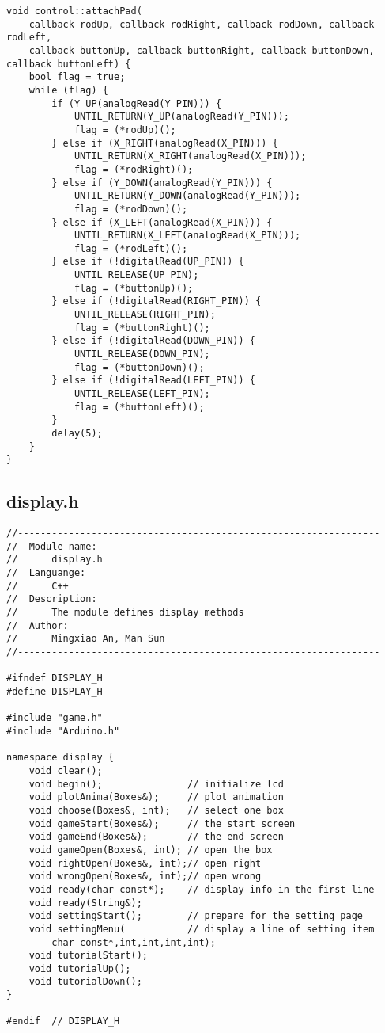 \begin{verbatim}
void control::attachPad(
    callback rodUp, callback rodRight, callback rodDown, callback rodLeft,
    callback buttonUp, callback buttonRight, callback buttonDown, callback buttonLeft) {
    bool flag = true;
    while (flag) {
        if (Y_UP(analogRead(Y_PIN))) {
            UNTIL_RETURN(Y_UP(analogRead(Y_PIN)));
            flag = (*rodUp)();
        } else if (X_RIGHT(analogRead(X_PIN))) {
            UNTIL_RETURN(X_RIGHT(analogRead(X_PIN)));
            flag = (*rodRight)();
        } else if (Y_DOWN(analogRead(Y_PIN))) {
            UNTIL_RETURN(Y_DOWN(analogRead(Y_PIN)));
            flag = (*rodDown)();
        } else if (X_LEFT(analogRead(X_PIN))) {
            UNTIL_RETURN(X_LEFT(analogRead(X_PIN)));
            flag = (*rodLeft)();
        } else if (!digitalRead(UP_PIN)) {
            UNTIL_RELEASE(UP_PIN);
            flag = (*buttonUp)();
        } else if (!digitalRead(RIGHT_PIN)) {
            UNTIL_RELEASE(RIGHT_PIN);
            flag = (*buttonRight)();
        } else if (!digitalRead(DOWN_PIN)) {
            UNTIL_RELEASE(DOWN_PIN);
            flag = (*buttonDown)();
        } else if (!digitalRead(LEFT_PIN)) {
            UNTIL_RELEASE(LEFT_PIN);
            flag = (*buttonLeft)();
        }
        delay(5);
    }
}
\end{verbatim}

\subsection{display.h}
\begin{verbatim}
//----------------------------------------------------------------
//  Module name:
//      display.h
//  Languange:
//      C++
//  Description:
//      The module defines display methods
//  Author:
//      Mingxiao An, Man Sun
//----------------------------------------------------------------

#ifndef DISPLAY_H
#define DISPLAY_H

#include "game.h"
#include "Arduino.h"

namespace display {
    void clear();
    void begin();               // initialize lcd
    void plotAnima(Boxes&);     // plot animation
    void choose(Boxes&, int);   // select one box
    void gameStart(Boxes&);     // the start screen
    void gameEnd(Boxes&);       // the end screen
    void gameOpen(Boxes&, int); // open the box
    void rightOpen(Boxes&, int);// open right
    void wrongOpen(Boxes&, int);// open wrong
    void ready(char const*);    // display info in the first line
    void ready(String&);
    void settingStart();        // prepare for the setting page
    void settingMenu(           // display a line of setting item
        char const*,int,int,int,int);
    void tutorialStart();
    void tutorialUp();
    void tutorialDown();
}

#endif  // DISPLAY_H

\end{verbatim}

